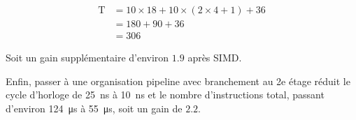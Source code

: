\documentclass[a11paper]{article}
\newcommand{\todo}[1]{\begin{color}{Red}\textbf{TODO:} #1\end{color}}
\begin{document}
\begin{align}
  \text{T} &= 10 \times 18 + 10 \times (2 \times 4 + 1) + 36 \\
  &= 180 + 90 + 36 \\
  &= 306
\end{align}

Soit un gain supplémentaire d’environ $1.9$ après SIMD.

Enfin, passer à une organisation pipeline avec branchement au 2e étage réduit
le cycle d’horloge de \SI{25}{\nano\s} à \SI{10}{\nano\s} et le nombre
d’instructions total, passant d’environ \SI{124}{\micro\s} à \SI{55}{\micro\s},
soit un gain de $2.2$.


\end{document}
